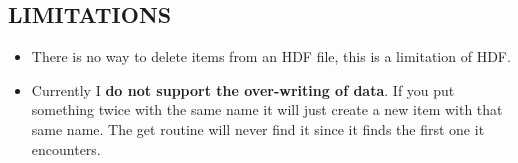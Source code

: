 \documentclass{article}
\begin{document}
\subsection{LIMITATIONS}

\begin{itemize}
 \item There is no way to delete items from an HDF file, this is a limitation of HDF.
 \item Currently I {\bf do not support the over-writing of data}. If you put something
     twice with the same name it will just create a new item with that same name. The get
     routine will never find it since it finds the first one it encounters. 
\end{itemize}
\end{document}
